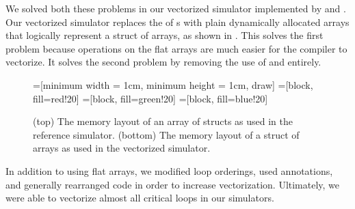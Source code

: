 We solved both these problems in our vectorized simulator implemented by
 and . Our vectorized simulator
replaces the \cppvec{} of \cpparr{}s with plain dynamically allocated arrays
that logically represent a struct of arrays, as shown in .
This solves the first problem because operations on the flat arrays are much
easier for the compiler to vectorize. It solves the second problem by removing
the use of \cppvec{} and \cpparr{} entirely.

\begin{figure}[h]
  \centering
  =[minimum width = 1cm, minimum height = 1cm, draw]
   =[block, fill=red!20]
  =[block, fill=green!20]
  =[block, fill=blue!20]

  \vspace{0.5cm}

  \caption{%
    (top) The memory layout of an array of structs as used in the reference
    simulator. (bottom) The memory layout of a struct of arrays as used in the
    vectorized simulator.
  }\label{fig:vec-to-arr}
\end{figure}

In addition to using flat arrays, we modified loop orderings, used
 annotations, and generally rearranged code in order to
increase vectorization. Ultimately, we were able to vectorize almost all
critical loops in our simulators.
